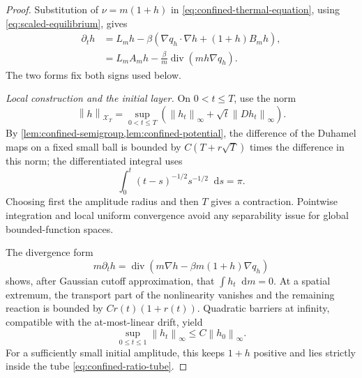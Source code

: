 \documentclass[11pt,reqno]{amsart}
\numberwithin{equation}{section}
\theoremstyle{definition}
\theoremstyle{remark}
\newcommand{\diver}{\operatorname{div}}
\newcommand{\dd}{\mathop{}\!\mathrm d}
\newcommand{\norm}[1]{\left\lVert#1\right\rVert}
\begin{document}
\begin{proof}
Substitution of $\nu=m(1+h)$ in \eqref{eq:confined-thermal-equation}, using \eqref{eq:scaled-equilibrium}, gives
\begin{align}
 \partial_th
 &=L_mh-\beta\left(\nabla q_h\cdot\nabla h+(1+h)B_mh\right),
 \label{eq:confined-ratio-equation}\\
 &=L_mA_mh-\frac\beta m\diver(mh\nabla q_h).
 \label{eq:confined-ratio-divergence}
\end{align}
The two forms fix both signs used below.

\emph{Local construction and the initial layer.}
On $0<t\leq T$, use the norm
\begin{equation}\label{eq:confined-local-norm}
 \norm h_{\mathcal X_T}=\sup_{0<t\leq T}
 \left(\norm{h_t}_\infty+\sqrt t\norm{Dh_t}_\infty\right).
\end{equation}
By \cref{lem:confined-semigroup,lem:confined-potential}, the difference of the Duhamel maps on a fixed small ball is bounded by $C(T+r\sqrt T)$ times the difference in this norm; the differentiated integral uses
\begin{equation}\label{eq:beta-integral-half}
 \int_0^t(t-s)^{-1/2}s^{-1/2}\dd s=\pi.
\end{equation}
Choosing first the amplitude radius and then $T$ gives a contraction. Pointwise integration and local uniform convergence avoid any separability issue for global bounded-function spaces.

The divergence form
\begin{equation}\label{eq:confined-mass-form}
 m\partial_th=\diver\left(m\nabla h-\beta m(1+h)\nabla q_h\right)
\end{equation}
shows, after Gaussian cutoff approximation, that $\int h_t\dd m=0$. At a spatial extremum, the transport part of the nonlinearity vanishes and the remaining reaction is bounded by $Cr(t)(1+r(t))$. Quadratic barriers at infinity, compatible with the at-most-linear drift, yield
\begin{equation}\label{eq:confined-short-amplitude}
 \sup_{0\leq t\leq1}\norm{h_t}_\infty\leq C\norm{h_0}_\infty.
\end{equation}
For a sufficiently small initial amplitude, this keeps $1+h$ positive and lies strictly inside the tube \eqref{eq:confined-ratio-tube}.


\end{proof}
\end{document}
